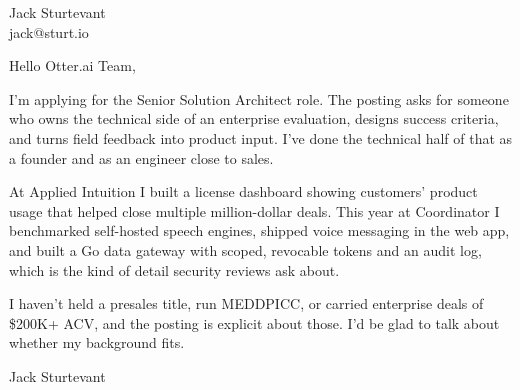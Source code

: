 \documentclass[11pt]{article}
\begin{document}
\raggedright

{\namefont\fontsize{20pt}{24pt}\selectfont Jack Sturtevant}\\[-0.3em]
jack@sturt.io

\vspace{1.2em}

Hello Otter.ai Team,

I'm applying for the Senior Solution Architect role. The posting asks for someone who owns the technical side of an enterprise evaluation, designs success criteria, and turns field feedback into product input. I've done the technical half of that as a founder and as an engineer close to sales.

At Applied Intuition I built a license dashboard showing customers' product usage that helped close multiple million-dollar deals. This year at Coordinator I benchmarked self-hosted speech engines, shipped voice messaging in the web app, and built a Go data gateway with scoped, revocable tokens and an audit log, which is the kind of detail security reviews ask about.

I haven't held a presales title, run MEDDPICC, or carried enterprise deals of \$200K+ ACV, and the posting is explicit about those. I'd be glad to talk about whether my background fits.

\vspace{0.6em}
Jack Sturtevant
\end{document}
